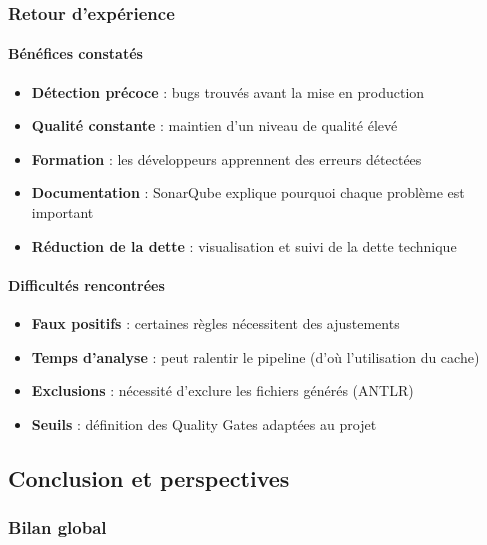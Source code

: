 \subsubsection{Retour d'expérience}

\paragraph{Bénéfices constatés}

\begin{itemize}
    \item \textbf{Détection précoce} : bugs trouvés avant la mise en production
    \item \textbf{Qualité constante} : maintien d'un niveau de qualité élevé
    \item \textbf{Formation} : les développeurs apprennent des erreurs détectées
    \item \textbf{Documentation} : SonarQube explique pourquoi chaque problème est important
    \item \textbf{Réduction de la dette} : visualisation et suivi de la dette technique
\end{itemize}

\paragraph{Difficultés rencontrées}

\begin{itemize}
    \item \textbf{Faux positifs} : certaines règles nécessitent des ajustements
    \item \textbf{Temps d'analyse} : peut ralentir le pipeline (d'où l'utilisation du cache)
    \item \textbf{Exclusions} : nécessité d'exclure les fichiers générés (ANTLR)
    \item \textbf{Seuils} : définition des Quality Gates adaptées au projet
\end{itemize}

\subsection{Conclusion et perspectives}

\subsubsection{Bilan global}

